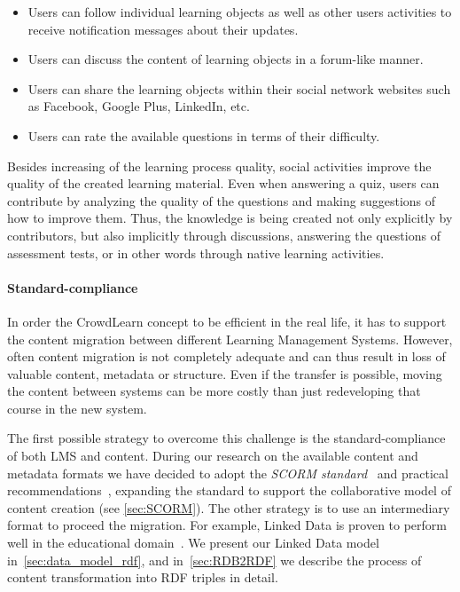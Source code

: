 \documentclass[ngerman,UKenglish,table]{scrbook}
\begin{document}
\begin{itemize}
\item Users can follow individual learning objects as well as other users activities to receive notification messages about their updates. 
\item Users can discuss the content of learning objects in a forum-like manner. 
\item Users can share the learning objects within their social network websites such as Facebook, Google Plus, LinkedIn, etc. 
\item Users can rate the available questions in terms of their difficulty.
\end{itemize}

Besides increasing of the learning process quality, social activities improve the quality of the created learning material.
Even when answering a quiz, users can contribute by analyzing the quality of the questions and making suggestions of how to improve them.
Thus, the knowledge is being created not only explicitly by contributors, but also implicitly through discussions, answering the questions of assessment tests, or in other words through native learning activities.

\paragraph{Standard-compliance}
In order the CrowdLearn concept to be efficient in the real life, it has to support the content migration between different Learning Management Systems.
However, often content migration is not completely adequate and can thus result in loss of valuable content, metadata or structure.
Even if the transfer is possible, moving the content between systems can be more costly than just redeveloping that course in the new system.

The first possible strategy to overcome this challenge is the standard-compliance of both LMS and content.
During our research on the available content and metadata formats we have decided to adopt the \emph{SCORM standard}~\cite{scorm_specification2011} and practical recommendations~\cite{scorm2011}, expanding the standard to support the collaborative model of content creation (see \autoref{sec:SCORM}).
The other strategy is to use an intermediary format to proceed the migration.
For example, Linked Data is proven to perform well in the educational domain~\cite{guy2014linkedup}.  
We present our Linked Data model in~\autoref{sec:data_model_rdf}, and in~\autoref{sec:RDB2RDF} we describe the process of content transformation into RDF triples in detail.
\end{document}
